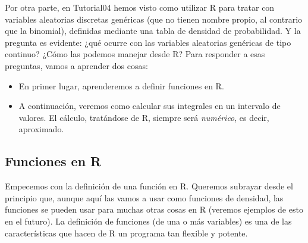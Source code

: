 \documentclass[10pt,a4paper]{article}\usepackage[]{graphicx}\usepackage[]{color}
\newcounter{cont01}
\begin{document}
Por otra parte, en Tutorial04 hemos visto como utilizar R para tratar con variables aleatorias discretas genéricas (que no tienen nombre propio, al contrario que la binomial), definidas mediante una tabla de densidad de probabilidad.  Y la pregunta es evidente: ¿qué ocurre con las variables aleatorias genéricas de tipo continuo? ¿Cómo las podemos manejar desde R?
%
Para responder a esas preguntas, vamos a aprender dos cosas:
\begin{itemize}
  \item En primer lugar, aprenderemos a definir funciones en R.
  \item A continuación, veremos como calcular sus integrales en un intervalo de valores. El cálculo, tratándose de R, siempre será {\em numérico}, es decir, aproximado.
\end{itemize}

\subsection{Funciones en R}
\label{tut05:subsec:FuncionesR}

Empecemos con la definición de una función en R. Queremos subrayar desde el principio que, aunque aquí las vamos a usar como funciones de densidad, las funciones se pueden usar para muchas otras cosas en R (veremos ejemplos de esto en el futuro).  La definición de funciones (de una o más variables) es una de las características que hacen de R un programa tan flexible y potente.
\end{document}
